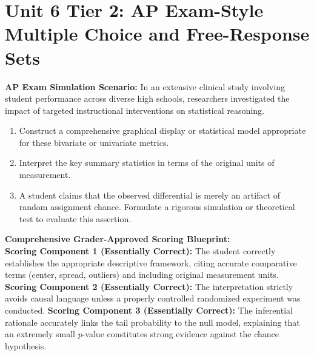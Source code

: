 \section{Unit 6 Tier 2: AP Exam-Style Multiple Choice and Free-Response Sets}
\begin{workbookbox}
\textbf{AP Exam Simulation Scenario:} In an extensive clinical study involving student performance across diverse high schools, researchers investigated the impact of targeted instructional interventions on statistical reasoning.
\begin{enumerate}[label=(\alph*)]
  \item Construct a comprehensive graphical display or statistical model appropriate for these bivariate or univariate metrics.
  \item Interpret the key summary statistics in terms of the original units of measurement.
  \item A student claims that the observed differential is merely an artifact of random assignment chance. Formulate a rigorous simulation or theoretical test to evaluate this assertion.
\end{enumerate}
\textbf{Comprehensive Grader-Approved Scoring Blueprint:}\\
\textbf{Scoring Component 1 (Essentially Correct):} The student correctly establishes the appropriate descriptive framework, citing accurate comparative terms (center, spread, outliers) and including original measurement units.
\textbf{Scoring Component 2 (Essentially Correct):} The interpretation strictly avoids causal language unless a properly controlled randomized experiment was conducted.
\textbf{Scoring Component 3 (Essentially Correct):} The inferential rationale accurately links the tail probability to the null model, explaining that an extremely small $p$-value constitutes strong evidence against the chance hypothesis.
\end{workbookbox}\vspace{6pt}
